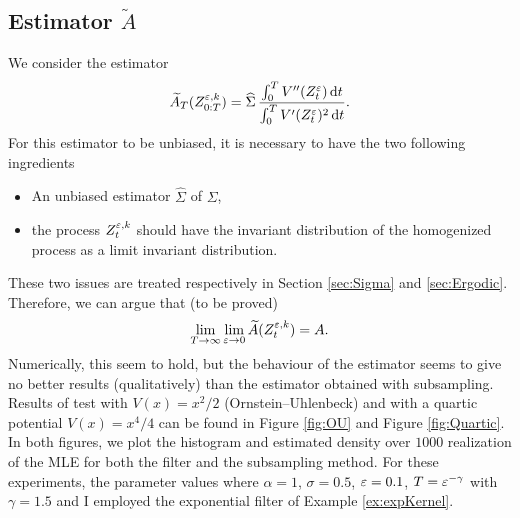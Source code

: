 \documentclass[10pt]{article}
\begin{document}
\subsection{Estimator $\widetilde A$}
We consider the estimator
\begin{equation}
	\widetilde A_T(Z_{0:T}^{\varepsilon,k}) = \widehat \Sigma \, \frac{\int_0^T  V''(Z_t^\varepsilon) \,\mathrm{d} t}{\int_0^T V'(Z_t^\varepsilon)^2 \,\mathrm{d} t}.
\end{equation}
For this estimator to be unbiased, it is necessary to have the two following ingredients
\begin{itemize}[label=-]
	\item An unbiased estimator $\widehat \Sigma$ of $\Sigma$,
	\item the process $Z_t^{\varepsilon,k}$ should have the invariant distribution of the homogenized process as a limit invariant distribution.
\end{itemize}
These two issues are treated respectively in Section \ref{sec:Sigma} and \ref{sec:Ergodic}. Therefore, we can argue that (to be proved)
\begin{equation}
	\lim_{T\to\infty}\lim_{\varepsilon \to 0} \widetilde A(Z_t^{\varepsilon,k}) = A.
\end{equation}
Numerically, this seem to hold, but the behaviour of the estimator seems to give no better results (qualitatively) than the estimator obtained with subsampling. Results of test with $V(x) = x^2/2$ (Ornstein--Uhlenbeck) and with a quartic potential $V(x) = x^4 / 4$ can be found in Figure \ref{fig:OU} and Figure \ref{fig:Quartic}. In both figures, we plot the histogram and estimated density over $1000$ realization of the MLE for both the filter and the subsampling method. For these experiments, the parameter values where $\alpha = 1$, $\sigma = 0.5$, $\varepsilon=0.1$, $T = \varepsilon^{-\gamma}$ with $\gamma = 1.5$ and I employed the exponential filter of Example \ref{ex:expKernel}.

%
%
\end{document}

